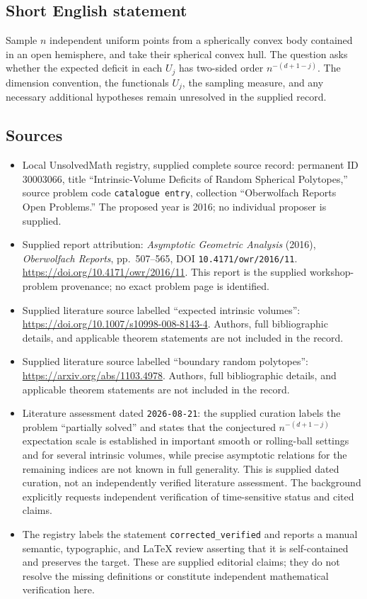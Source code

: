 \documentclass[11pt]{article}
\begin{document}
\subsection{Short English statement}
Sample \(n\) independent uniform points from a spherically convex body contained in an open hemisphere, and take their spherical convex hull. The question asks whether the expected deficit in each \(U_j\) has two-sided order \(n^{-(d+1-j)}\). The dimension convention, the functionals \(U_j\), the sampling measure, and any necessary additional hypotheses remain unresolved in the supplied record.
\subsection{Sources}
\begin{itemize}
\item Local UnsolvedMath registry, supplied complete source record: permanent ID \(30003066\), title ``Intrinsic-Volume Deficits of Random Spherical Polytopes,'' source problem code \texttt{catalogue entry}, collection ``Oberwolfach Reports Open Problems.'' The proposed year is 2016; no individual proposer is supplied.
\item Supplied report attribution: \emph{Asymptotic Geometric Analysis} (2016), \emph{Oberwolfach Reports}, pp.\ 507--565, DOI \texttt{10.4171/owr/2016/11}. \url{https://doi.org/10.4171/owr/2016/11}. This report is the supplied workshop-problem provenance; no exact problem page is identified.
\item Supplied literature source labelled ``expected intrinsic volumes'': \url{https://doi.org/10.1007/s10998-008-8143-4}. Authors, full bibliographic details, and applicable theorem statements are not included in the record.
\item Supplied literature source labelled ``boundary random polytopes'': \url{https://arxiv.org/abs/1103.4978}. Authors, full bibliographic details, and applicable theorem statements are not included in the record.
\item Literature assessment dated \texttt{2026-08-21}: the supplied curation labels the problem ``partially solved'' and states that the conjectured \(n^{-(d+1-j)}\) expectation scale is established in important smooth or rolling-ball settings and for several intrinsic volumes, while precise asymptotic relations for the remaining indices are not known in full generality. This is supplied dated curation, not an independently verified literature assessment. The background explicitly requests independent verification of time-sensitive status and cited claims.
\item The registry labels the statement \texttt{corrected\_verified} and reports a manual semantic, typographic, and LaTeX review asserting that it is self-contained and preserves the target. These are supplied editorial claims; they do not resolve the missing definitions or constitute independent mathematical verification here.
\end{itemize}
\end{document}

